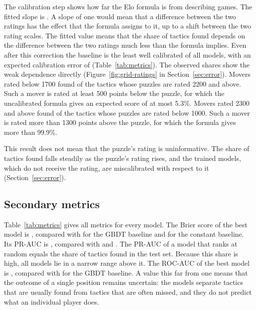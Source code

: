 \documentclass[11pt]{article}
\begin{document}
The calibration step shows how far the Elo formula is from describing games.
The fitted slope is . A slope of one would
mean that a difference between the two ratings has the effect that the
formula assigns to it, up to a shift between the two rating scales. The
fitted value means that the share of tactics found depends on the difference
between the two ratings much less than the formula implies. Even after this
correction the baseline is the least well calibrated of all models, with an
expected calibration error of 
(Table~\ref{tab:metrics}).\iflook{} The observed shares show the weak
dependence directly (Figure~\ref{fig:grid-ratings} in
Section~\ref{sec:error}). Movers rated below 1700 found
 of the tactics whose puzzles are rated
2200 and above. Such a mover is rated at least 500 points below the puzzle,
for which the uncalibrated formula gives an expected score of at most 5.3\%.
Movers rated 2300 and above found  of
the tactics whose puzzles are rated below 1000. Such a mover is rated more
than 1300 points above the puzzle, for which the formula gives more than
99.9\%.\fi

This result does not mean that the puzzle's rating is uninformative. The
share of tactics found falls steadily as the puzzle's rating rises, and the
trained models, which do not receive the rating, are miscalibrated with
respect to it (Section~\ref{sec:error}).

\subsection{Secondary metrics}

Table~\ref{tab:metrics} gives all metrics for every model. The Brier score of
the best model is , compared with  for the
GBDT baseline and  for the constant baseline. Its PR-AUC is
, compared with  and .
The PR-AUC of a model that ranks at random equals the share of tactics found
in the test set. Because this share is high, all models lie in a narrow
range above it. The ROC-AUC of the best model is , compared
with  for the GBDT baseline. A value this far from one
means that the outcome of a single position remains uncertain: the models
separate tactics that are usually found from tactics that are often missed,
and they do not predict what an individual player does.
\end{document}
